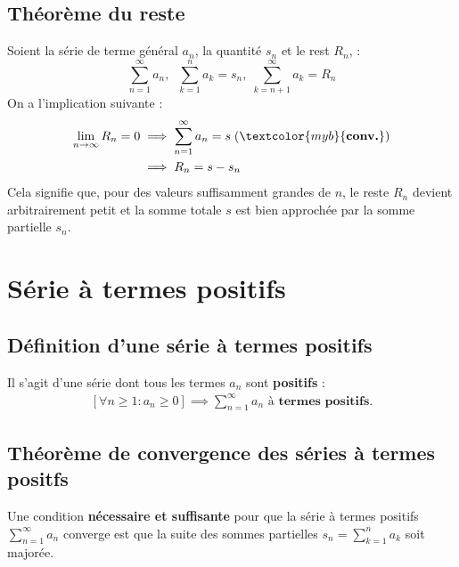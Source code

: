 \documentclass{report}
\begin{document}
\begin{multicols*}{3}
    \section{Théorème du reste}

        Soient la série de terme général $a_n$, la quantité $s_n$ et le rest $R_n$, :
        \[%
        \sum_{n=1}^{\infty }a_n, \;\;
        \sum_{k=1}^{n }a_k = s_n, \; \sum_{k= n+1}^{\infty }a_k = R_n
        \]%
        On a l'implication suivante :
        \begin{align*}
            \lim\limits_{n\to\infty }R_n = 0 
            &\implies \sum_{n=1}^{\infty }a_n = s \; (\textcolor{myb}{\textbf{conv.}})  \\
            &\implies R_n = s - s_n 
        \end{align*}
        Cela signifie que, pour des valeurs suffisamment grandes de \(n\), 
        le reste \(R_n\) devient 
        arbitrairement petit et la somme totale \(s\) est bien approchée 
        par la somme partielle \(s_n\).    


\chapter{Série à termes positifs}


    \section{Définition d'une série à termes positifs}
    Il s'agit d'une série dont tous les termes $a_{n}$ sont \textbf{positifs} :
    \begin{align*}
        \left[ \forall n \geq 1 \colon a_n \geq 0 \right] \implies \sum_{n=1}^{\infty }a_n 
     \textbf{ à termes positifs}.
    \end{align*}
    
                

    \section{Théorème de convergence des séries à termes positfs}
    Une condition \textbf{nécessaire et suffisante} pour que la série à termes positifs 
        $\sum_{n=1}^{\infty }a_n$ converge est que la suite des sommes partielles
        $s_n = \sum_{k=1}^{n }a_k$ soit majorée. 
        \\\\ 


\end{multicols*}
\end{document}
